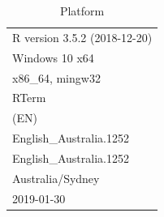 \documentclass{grattan}\usepackage[]{graphicx}\usepackage[]{color}
\begin{document}
\begin{table}[!htb]
\centering
\caption{Platform}
\begin{tabularx}{\linewidth}{l}
  \toprule
 R version 3.5.2 (2018-12-20) \\ 
  Windows 10 x64 \\ 
  x86\_64, mingw32 \\ 
  RTerm \\ 
  (EN) \\ 
  English\_Australia.1252 \\ 
  English\_Australia.1252 \\ 
  Australia/Sydney \\ 
  2019-01-30 \\ 
   \bottomrule
\end{tabularx}

\end{table}

\end{document}

